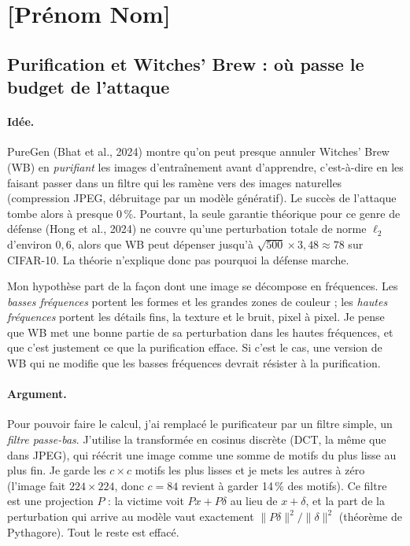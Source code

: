 \section*{[Prénom Nom]}

\subsection*{Purification et Witches' Brew : où passe le budget de l'attaque}

\paragraph{Idée.}
PureGen (Bhat et al., 2024) montre qu'on peut presque annuler Witches'
Brew (WB) en \emph{purifiant} les images d'entraînement avant d'apprendre,
c'est-à-dire en les faisant passer dans un filtre qui les ramène vers des
images naturelles (compression JPEG, débruitage par un modèle génératif).
Le succès de l'attaque tombe alors à presque 0\,\%. Pourtant, la seule
garantie théorique pour ce genre de défense (Hong et al., 2024) ne couvre
qu'une perturbation totale de norme $\ell_2$ d'environ $0{,}6$, alors que
WB peut dépenser jusqu'à $\sqrt{500}\times3{,}48\approx78$ sur CIFAR-10.
La théorie n'explique donc pas pourquoi la défense marche.

Mon hypothèse part de la façon dont une image se décompose en
fréquences. Les \emph{basses fréquences} portent les formes et les grandes
zones de couleur ; les \emph{hautes fréquences} portent les détails fins,
la texture et le bruit, pixel à pixel. Je pense que WB met une bonne
partie de sa perturbation dans les hautes fréquences, et que c'est
justement ce que la purification efface. Si c'est le cas, une version de
WB qui ne modifie que les basses fréquences devrait résister à la
purification.

\paragraph{Argument.}
Pour pouvoir faire le calcul, j'ai remplacé le purificateur par un filtre
simple, un \emph{filtre passe-bas}. J'utilise la transformée en cosinus
discrète (DCT, la même que dans JPEG), qui réécrit une image comme une
somme de motifs du plus lisse au plus fin. Je garde les $c\times c$ motifs
les plus lisses et je mets les autres à zéro (l'image fait
$224\times224$, donc $c=84$ revient à garder 14\,\% des motifs). Ce filtre
est une projection $P$ : la victime voit $Px+P\delta$ au lieu de
$x+\delta$, et la part de la perturbation qui arrive au modèle vaut
exactement $\|P\delta\|^2/\|\delta\|^2$ (théorème de Pythagore). Tout le
reste est effacé.

